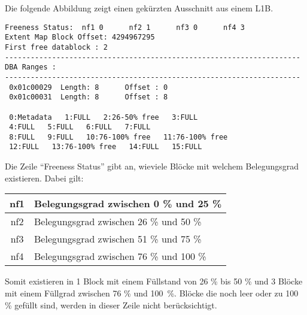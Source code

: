           Die folgende Abbildung zeigt einen gekürzten Ausschnitt aus einem L1B.
\clearpage
          \begin{lstlisting}[caption={Der Inhalt eines Level 1 Bitmap-Blocks},label=admin101,emph={[9]FULL},emphstyle={[9]\color{black}},language=terminal]
Freeness Status:  nf1 0      nf2 1      nf3 0      nf4 3
Extent Map Block Offset: 4294967295
First free datablock : 2
---------------------------------------------------------------------
DBA Ranges :
---------------------------------------------------------------------
 0x01c00029  Length: 8      Offset : 0
 0x01c00031  Length: 8      Offset : 8

 0:Metadata   1:FULL   2:26-50% free   3:FULL
 4:FULL   5:FULL   6:FULL   7:FULL
 8:FULL   9:FULL   10:76-100% free   11:76-100% free
 12:FULL   13:76-100% free   14:FULL   15:FULL

          \end{lstlisting}
          Die Zeile \enquote{Freeness Status} gibt an, wieviele Blöcke mit welchem Belegungsgrad existieren. Dabei gilt:
          \begin{center}
            \tabletail{
              \hline
            }
            \begin{supertabular}[h]{|c|l|}
              nf1 & Belegungsgrad zwischen 0 \% und 25 \% \\
              \hline
              nf2 & Belegungsgrad zwischen 26 \% und 50 \%  \\
              \hline
              nf3 & Belegungsgrad zwischen 51 \% und 75 \%  \\
              \hline
              nf4 & Belegungsgrad zwischen 76 \% und 100 \% \\
            \end{supertabular}
          \end{center}
          Somit existieren in  1 Block mit einem Füllstand von 26 \% bis 50 \% und 3 Blöcke mit einem Füllgrad zwischen 76 \% und 100~\%. Blöcke die noch leer oder zu 100 \% gefüllt sind, werden in dieser Zeile nicht berücksichtigt.

